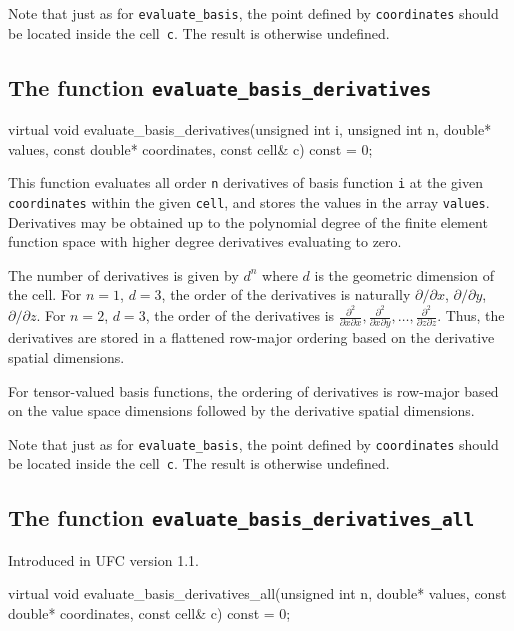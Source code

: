 Note that just as for \texttt{evaluate\_basis}, the point defined by
\texttt{coordinates} should be located inside the cell~\texttt{c}. The
result is otherwise undefined.

\subsection{The function \texttt{evaluate\_basis\_derivatives}}

\begin{code}
virtual void
evaluate_basis_derivatives(unsigned int i,
                           unsigned int n,
                           double* values,
                           const double* coordinates,
                           const cell& c) const = 0;
\end{code}

This function evaluates all order \texttt{n} derivatives of basis
function \texttt{i} at the given \texttt{coordinates} within the given
\texttt{cell}, and stores the values in the array \texttt{values}.
Derivatives may be obtained up to the polynomial degree of the finite
element function space with higher degree derivatives evaluating to
zero.

The number of derivatives is given by $d^n$ where $d$ is the geometric
dimension of the cell. For $n = 1$, $d = 3$, the order of the
derivatives is naturally $\partial/\partial x$, $\partial/\partial y$,
$\partial/\partial z$. For $n = 2$, $d = 3$, the order of the
derivatives is $\frac{\partial^2}{\partial x\partial x},
\frac{\partial^2}{\partial x\partial y}, \ldots,
\frac{\partial^2}{\partial z\partial z}$. Thus, the derivatives are
stored in a flattened row-major ordering based on the derivative
spatial dimensions.

For tensor-valued basis functions, the ordering of derivatives is
row-major based on the value space dimensions followed by the
derivative spatial dimensions.

Note that just as for \texttt{evaluate\_basis}, the point defined by
\texttt{coordinates} should be located inside the cell~\texttt{c}. The
result is otherwise undefined.

\subsection{The function \texttt{evaluate\_basis\_derivatives\_all}}
Introduced in UFC version 1.1.

\begin{code}
virtual void
evaluate_basis_derivatives_all(unsigned int n,
                               double* values,
                               const double* coordinates,
                               const cell& c) const = 0;
\end{code}

